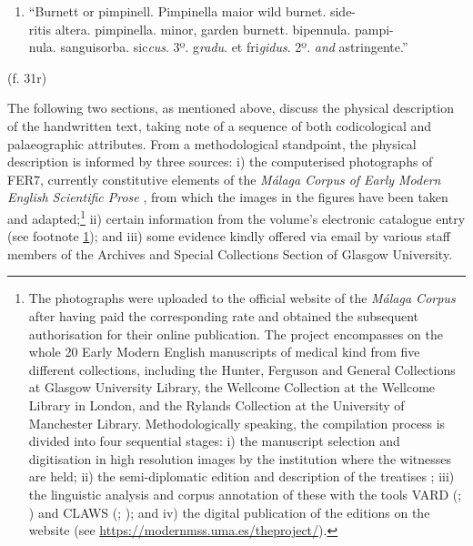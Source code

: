 \begin{paper}
\begin{enumerate}
\def\labelenumi{(\arabic{enumi})}
\item\label{lorente:numlist:1}
  ``Burnett or pimpinell. Pimpinella maior wild burnet. side-\\
  ritis altera. pimpinella. minor, garden burnett. bipennula. pampi-\\
  nula. sanguisorba. sic\emph{cus}. 3º. g\emph{radu}. et fri\emph{gidus}.
2º. \emph{and} astringente.'' 
\end{enumerate}
\begin{flushright}
    (f. 31r)
\end{flushright}


The following two sections, as mentioned above, discuss the physical
description of the handwritten text, taking note of a
sequence of both codicological and palaeographic attributes. From a
methodological standpoint, the physical description is informed by three sources: i) the computerised
photographs of FER7, currently constitutive elements of the \emph{Málaga
Corpus of Early Modern English Scientific Prose} \citep{calle-martin_malaga_2016}, from which the images in the figures have
been taken and adapted;\footnote{\label{lorente:fn:4}The photographs were uploaded to the
  official website of the \emph{Málaga Corpus} after having paid the
  corresponding rate and obtained the subsequent authorisation for their
  online publication. The project encompasses on the whole 20 Early
  Modern English manuscripts of medical kind from five different
  collections, including the Hunter, Ferguson and General Collections at
  Glasgow University Library, the Wellcome Collection at the Wellcome
  Library in London, and the Rylands Collection at the University of
  Manchester Library. Methodologically speaking, the compilation process
  is divided into four sequential stages: i) the manuscript selection
  and digitisation in high resolution images by the institution where
  the witnesses are held; ii) the semi-diplomatic edition and
  description of the treatises \citep[34--35]{petti_english_1977}; iii) the linguistic
  analysis and corpus annotation of these with the tools VARD (\cite{rayson_vard_2005}; \cite{baron_vard2_2008}) and CLAWS (\cite{garside_claws_1987}; \cite{garside_hybrid_1997}); and iv) the digital publication of the editions on the
  website (see \url{https://modernmss.uma.es/theproject/}).} ii) certain
information from the volume's electronic catalogue entry (see footnote
\ref{lorente:fn:4}); and iii) some evidence kindly offered via email by various staff
members of the Archives and Special Collections Section of Glasgow
University.


\end{paper}
